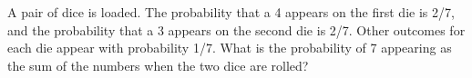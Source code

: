 \documentclass[../main.tex]{subfiles}
\begin{document}
A pair of dice is loaded.
The probability that a 4 appears on the first die is 2/7, and the probability that a 3 appears on the second die is 2/7.
Other outcomes for each die appear with probability 1/7.
What is the probability of 7 appearing as the sum of the numbers when the two dice are rolled?

\solution
\end{document}
